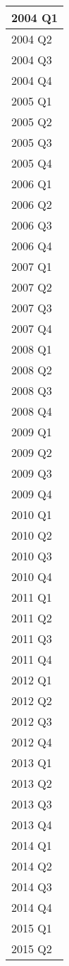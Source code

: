 \documentclass[
]{article}
\begin{document}
\begin{tabular}{l}
\hline
2004 Q1\\
\hline
2004 Q2\\
\hline
2004 Q3\\
\hline
2004 Q4\\
\hline
2005 Q1\\
\hline
2005 Q2\\
\hline
2005 Q3\\
\hline
2005 Q4\\
\hline
2006 Q1\\
\hline
2006 Q2\\
\hline
2006 Q3\\
\hline
2006 Q4\\
\hline
2007 Q1\\
\hline
2007 Q2\\
\hline
2007 Q3\\
\hline
2007 Q4\\
\hline
2008 Q1\\
\hline
2008 Q2\\
\hline
2008 Q3\\
\hline
2008 Q4\\
\hline
2009 Q1\\
\hline
2009 Q2\\
\hline
2009 Q3\\
\hline
2009 Q4\\
\hline
2010 Q1\\
\hline
2010 Q2\\
\hline
2010 Q3\\
\hline
2010 Q4\\
\hline
2011 Q1\\
\hline
2011 Q2\\
\hline
2011 Q3\\
\hline
2011 Q4\\
\hline
2012 Q1\\
\hline
2012 Q2\\
\hline
2012 Q3\\
\hline
2012 Q4\\
\hline
2013 Q1\\
\hline
2013 Q2\\
\hline
2013 Q3\\
\hline
2013 Q4\\
\hline
2014 Q1\\
\hline
2014 Q2\\
\hline
2014 Q3\\
\hline
2014 Q4\\
\hline
2015 Q1\\
\hline
2015 Q2\\

\end{tabular}
\end{document}

